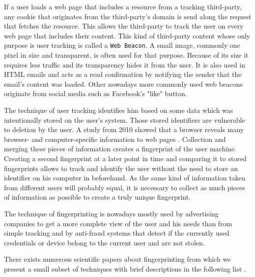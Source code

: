 	If a user loads a web page that includes a resource from a tracking third-party, any cookie that originates from the third-party's domain is send along the request that fetches the resource. This allows the third-party to track the user on every web page that includes their content. This kind of third-party content whose only purpose is user tracking is called a \texttt{Web Beacon}. A small image, commonly one pixel in size and transparent, is often used for that purpose. Because of its size it requires less traffic and its transparency hides it from the user. It is also used in HTML emails and acts as a read confirmation by notifying the sender that the email's content was loaded. Other nowadays more commonly used web beacons originate from social media such as Facebook's "like" button. 

	The technique of user tracking identifies him based on some data which was intentionally stored on the user's system. Those stored identifiers are vulnerable to deletion by the user. A study from 2010 showed that a browser reveals many browser- and computer-specific information to web pages \cite{Eckersley:2010:UYW:1881151.1881152}. Collection and merging these pieces of information creates a fingerprint of the user machine. Creating a second fingerprint at a later point in time and comparing it to stored fingerprints allows to track and identify the user without the need to store an identifier on his computer in beforehand. As the same kind of information taken from different users will probably equal, it is necessary to collect as much pieces of information as possible to create a truly unique fingerprint. 
	
	The technique of fingerprinting is nowadays mostly used by advertising companies to get a more complete view of the user and his needs than from simple tracking and by anti-fraud systems that detect if the currently used credentials or device belong to the current user and are not stolen.

	There exists numerous scientific papers about fingerprinting from which we present a small subset of techniques with brief descriptions in the following list \cite{paulstone_historysniffing, MBYS11, Nikiforakis:2013:CME:2497621.2498133, Eckersley:2010:UYW:1881151.1881152, MS12, olejnik:hal-00747841}. 
	
